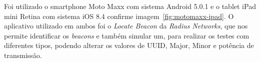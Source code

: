 \documentclass[
	12pt,				%
	openright,			%
	oneside,			%
	a4paper,			%
	chapter=TITLE,		%
	english,			%
	brazil				%
	]{abntex2}
\begin{document}
{\begin{figure}[h!]
\end{figure}

Foi utilizado o smartphone Moto Maxx com sistema Android 5.0.1 e o tablet iPad mini Retina com sistema iOS 8.4 confirme imagem~\ref{fig:motomaxx-ipad}. O aplicativo utilizado em ambos foi o \textit{Locate Beacon} da \textit{Radius Networks}, que nos permite identificar os \textit{beacons} e também simular um, para realizar os testes com diferentes tipos, podendo alterar os valores de UUID, Major, Minor e potência de transmissão.

\begin{figure}[h!]
\end{figure}



}
\end{document}
